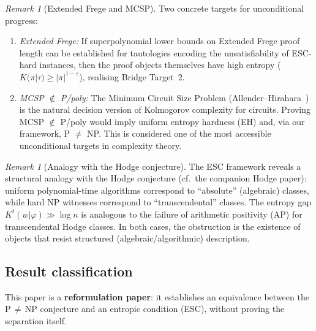 \documentclass[aps,prd,twocolumn,superscriptaddress,nofootinbib]{revtex4-2}
\theoremstyle{definition}
\theoremstyle{remark}
\newtheorem{remark}[theorem]{Remark}
\begin{document}
\begin{remark}[Extended Frege and MCSP]
\label{rem:frege-mcsp}
Two concrete targets for unconditional progress:
\begin{enumerate}
\item \emph{Extended Frege:} If superpolynomial lower bounds on Extended Frege proof length can be established for tautologies encoding the unsatisfiability of ESC-hard instances, then the proof objects themselves have high entropy ($K(\pi | \tau) \geq |\pi|^{1-\varepsilon}$), realising Bridge Target~2.
\item \emph{MCSP $\notin$ P/poly:} The Minimum Circuit Size Problem (Allender--Hirahara~\cite{AllenderHirahara2019}) is the natural decision version of Kolmogorov complexity for circuits. Proving MCSP $\notin$ P/poly would imply uniform entropy hardness (EH) and, via our framework, P $\neq$ NP. This is considered one of the most accessible unconditional targets in complexity theory.
\end{enumerate}
\end{remark}

\begin{remark}[Analogy with the Hodge conjecture]
\label{rem:hodge-analogy}
The ESC framework reveals a structural analogy with the Hodge conjecture (cf.\ the companion Hodge paper): uniform polynomial-time algorithms correspond to ``absolute'' (algebraic) classes, while hard NP witnesses correspond to ``transcendental'' classes. The entropy gap $K^t(w|\varphi) \gg \log n$ is analogous to the failure of arithmetic positivity (AP) for transcendental Hodge classes. In both cases, the obstruction is the existence of objects that resist structured (algebraic/algorithmic) description.
\end{remark}


\subsection*{Result classification}

This paper is a \textbf{reformulation paper}: it establishes an equivalence between the P\,$\neq$\,NP conjecture and an entropic condition (ESC), without proving the separation itself.
\end{document}
